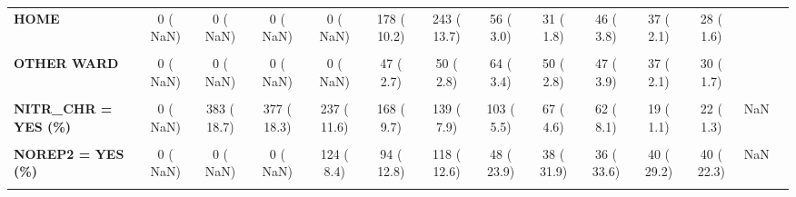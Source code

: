 \documentclass[
]{article}
\begin{document}
\begin{table}[H]
\begin{tabular}[t]{>{\raggedright\arraybackslash}p{5em}ccccccccccccc}
\textbf{HOME} & 0 (  NaN) & 0 (  NaN) & 0 (  NaN) & 0 (  NaN) & 178 ( 10.2) & 243 ( 13.7) & 56 (  3.0) & 31 (  1.8) & 46 (  3.8) & 37 (  2.1) & 28 (  1.6) &  & \\
\textbf{\cellcolor{gray!10}{OTHER}} & \cellcolor{gray!10}{0 (  NaN)} & \cellcolor{gray!10}{0 (  NaN)} & \cellcolor{gray!10}{0 (  NaN)} & \cellcolor{gray!10}{0 (  NaN)} & \cellcolor{gray!10}{306 ( 17.6)} & \cellcolor{gray!10}{501 ( 28.2)} & \cellcolor{gray!10}{619 ( 32.8)} & \cellcolor{gray!10}{680 ( 38.4)} & \cellcolor{gray!10}{590 ( 48.7)} & \cellcolor{gray!10}{481 ( 27.5)} & \cellcolor{gray!10}{403 ( 23.3)} & \cellcolor{gray!10}{} & \cellcolor{gray!10}{}\\
\textbf{OTHER WARD} & 0 (  NaN) & 0 (  NaN) & 0 (  NaN) & 0 (  NaN) & 47 (  2.7) & 50 (  2.8) & 64 (  3.4) & 50 (  2.8) & 47 (  3.9) & 37 (  2.1) & 30 (  1.7) &  & \\
\textbf{\cellcolor{gray!10}{MINOR\_30D = YES (\%)}} & \cellcolor{gray!10}{0 (  NaN)} & \cellcolor{gray!10}{0 (  NaN)} & \cellcolor{gray!10}{0 (  NaN)} & \cellcolor{gray!10}{0 (  NaN)} & \cellcolor{gray!10}{0 (  NaN)} & \cellcolor{gray!10}{0 (  NaN)} & \cellcolor{gray!10}{0 (  NaN)} & \cellcolor{gray!10}{34 (  1.9)} & \cellcolor{gray!10}{47 (  3.2)} & \cellcolor{gray!10}{20 (  1.3)} & \cellcolor{gray!10}{15 (  1.3)} & \cellcolor{gray!10}{NaN} & \cellcolor{gray!10}{}\\
\textbf{NITR\_CHR = YES (\%)} & 0 (  NaN) & 383 ( 18.7) & 377 ( 18.3) & 237 ( 11.6) & 168 (  9.7) & 139 (  7.9) & 103 (  5.5) & 67 (  4.6) & 62 (  8.1) & 19 (  1.1) & 22 (  1.3) & NaN & \\
\textbf{\cellcolor{gray!10}{NOAC\_CHR = YES (\%)}} & \cellcolor{gray!10}{0 (  NaN)} & \cellcolor{gray!10}{0 (  NaN)} & \cellcolor{gray!10}{0 (  NaN)} & \cellcolor{gray!10}{0 (  NaN)} & \cellcolor{gray!10}{0 (  NaN)} & \cellcolor{gray!10}{0 (  NaN)} & \cellcolor{gray!10}{11 (  0.6)} & \cellcolor{gray!10}{44 (  2.5)} & \cellcolor{gray!10}{65 (  3.7)} & \cellcolor{gray!10}{94 (  5.4)} & \cellcolor{gray!10}{75 (  4.3)} & \cellcolor{gray!10}{NaN} & \cellcolor{gray!10}{}\\
\textbf{NOREP2 = YES (\%)} & 0 (  NaN) & 0 (  NaN) & 0 (  NaN) & 124 (  8.4) & 94 ( 12.8) & 118 ( 12.6) & 48 ( 23.9) & 38 ( 31.9) & 36 ( 33.6) & 40 ( 29.2) & 40 ( 22.3) & NaN & \\
\textbf{\cellcolor{gray!10}{NOREP3 = YES (\%)}} & \cellcolor{gray!10}{0 (  NaN)} & \cellcolor{gray!10}{0 (  NaN)} & \cellcolor{gray!10}{0 (  NaN)} & \cellcolor{gray!10}{18 (  1.2)} & \cellcolor{gray!10}{25 (  3.4)} & \cellcolor{gray!10}{18 (  1.9)} & \cellcolor{gray!10}{0 (  NaN)} & \cellcolor{gray!10}{0 (  NaN)} & \cellcolor{gray!10}{0 (  NaN)} & \cellcolor{gray!10}{0 (  NaN)} & \cellcolor{gray!10}{0 (  NaN)} & \cellcolor{gray!10}{NaN} & \cellcolor{gray!10}{}\\

\end{tabular}
\end{table}
\end{document}
